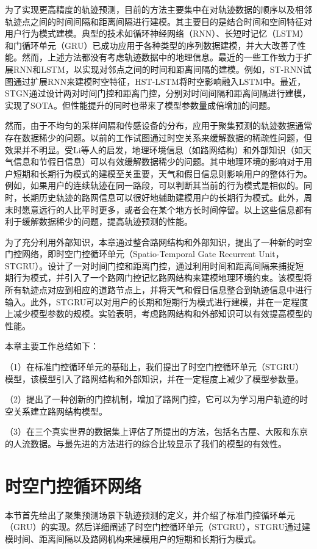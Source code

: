 \documentclass[master]{thesis-uestc}
\begin{document}
为了实现更高精度的轨迹预测，目前的方法主要集中在对轨迹数据的顺序以及相邻轨迹点之间的时间间隔和距离间隔进行建模。其主要目的是结合时间和空间特征对用户行为模式建模。典型的技术如循环神经网络（RNN）、长短时记忆（LSTM）和门循环单元（GRU）已成功应用于各种类型的序列数据建模，并大大改善了性能。然而，上述方法都没有考虑轨迹数据中的地理信息。最近的一些工作致力于扩展RNN和LSTM，以实现对邻点之间的时间和距离间隔的建模。例如，ST-RNN试图通过扩展RNN来建模时空特征，HST-LSTM将时空影响融入LSTM中。最近，STGN通过设计两对时间门控和距离门控，分别对时间间隔和距离间隔进行建模，实现了SOTA。但性能提升的同时也带来了模型参数量成倍增加的问题。

然而，由于不均匀的采样间隔和传感设备的分布，应用于聚集预测的轨迹数据通常存在数据稀少的问题。以前的工作试图通过时空关系来缓解数据的稀疏性问题，但效果并不明显。受Li等人的启发，地理环境信息（如路网结构）和外部知识（如天气信息和节假日信息）可以有效缓解数据稀少的问题。其中地理环境的影响对于用户短期和长期行为模式的建模至关重要，天气和假日信息则影响用户的整体行为。例如，如果用户的连续轨迹在同一路段，可以判断其当前的行为模式是相似的。同时，长期历史轨迹的路网信息可以很好地辅助建模用户的长期行为模式。此外，周末时愿意远行的人比平时更多，或者会在某个地方长时间停留。以上这些信息都有利于缓解数据稀少的问题，提高轨迹预测的性能。

为了充分利用外部知识，本章通过整合路网结构和外部知识，提出了一种新的时空门控网络，即时空门控循环单元（Spatio-Temporal Gate Recurrent Unit，STGRU）。设计了一对时间门控和距离门控，通过利用时间和距离间隔来捕捉短期行为模式，并引入了一个路网门控记忆路网结构来建模地理环境约束。该模型将所有轨迹点对应到相应的道路节点上，并将天气和假日信息整合到轨迹信息中进行输入。此外，STGRU可以对用户的长期和短期行为模式进行建模，并在一定程度上减少模型参数的规模。实验表明，考虑路网结构和外部知识可以有效提高模型的性能。

本章主要工作总结如下：

（1）在标准门控循环单元的基础上，我们提出了时空门控循环单元（STGRU）模型，该模型引入了路网结构和外部知识，并在一定程度上减少了模型参数量。

（2）提出了一种创新的门控机制，增加了路网门控，它可以为学习用户轨迹的时空关系建立路网结构模型。

（3）在三个真实世界的数据集上评估了所提出的方法，包括名古屋、大阪和东京的人流数据。与最先进的方法进行的综合比较显示了我们的模型的有效性。

\section{时空门控循环网络}
本节首先给出了聚集预测场景下轨迹预测的定义，并介绍了标准门控循环单元（GRU）的实现。然后详细阐述了时空门控循环单元（STGRU），STGRU通过建模时间、距离间隔以及路网机构来建模用户的短期和长期行为模式。
\end{document}
